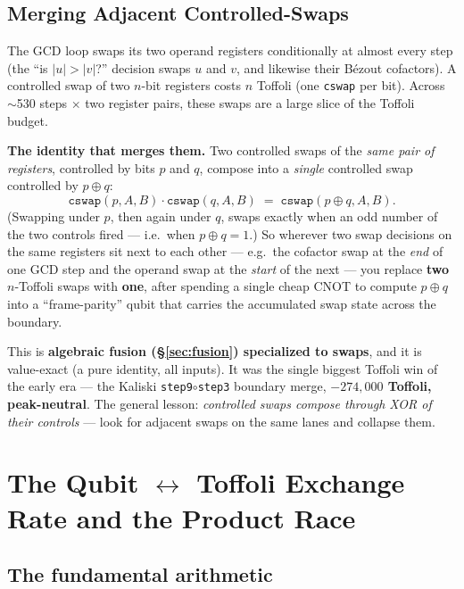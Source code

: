 \documentclass[11pt,a4paper]{article}
\begin{document}
\subsection{Merging Adjacent Controlled-Swaps}
\label{sec:cswapmerge}

The GCD loop swaps its two operand registers conditionally at almost every step (the ``is
$|u| > |v|$?'' decision swaps $u$ and $v$, and likewise their B\'ezout cofactors). A controlled swap
of two $n$-bit registers costs $n$ Toffoli (one \texttt{cswap} per bit). Across $\sim$530 steps
$\times$ two register pairs, these swaps are a large slice of the Toffoli budget.

\textbf{The identity that merges them.} Two controlled swaps of the \emph{same pair of registers},
controlled by bits $p$ and $q$, compose into a \emph{single} controlled swap controlled by
$p \oplus q$:
\[
  \texttt{cswap}(p, A, B)\cdot\texttt{cswap}(q, A, B) \;=\; \texttt{cswap}(p \oplus q, A, B).
\]
(Swapping under $p$, then again under $q$, swaps exactly when an odd number of the two controls fired
--- i.e.\ when $p \oplus q = 1$.) So wherever two swap decisions on the same registers sit next to
each other --- e.g.\ the cofactor swap at the \emph{end} of one GCD step and the operand swap at the
\emph{start} of the next --- you replace \textbf{two} $n$-Toffoli swaps with \textbf{one}, after
spending a single cheap CNOT to compute $p \oplus q$ into a ``frame-parity'' qubit that carries the
accumulated swap state across the boundary.

This is \textbf{algebraic fusion (\S\ref{sec:fusion}) specialized to swaps}, and it is value-exact (a
pure identity, all inputs). It was the single biggest Toffoli win of the early era --- the Kaliski
\texttt{step9}$\circ$\texttt{step3} boundary merge, \textbf{$-274{,}000$ Toffoli, peak-neutral}. The
general lesson: \emph{controlled swaps compose through XOR of their controls} --- look for adjacent
swaps on the same lanes and collapse them.

\section{The Qubit $\leftrightarrow$ Toffoli Exchange Rate and the Product Race}
\label{sec:exchange}

\subsection{The fundamental arithmetic}
\end{document}
